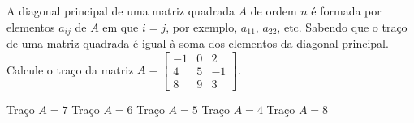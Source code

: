 A diagonal principal de uma matriz quadrada $A$ de ordem $n$ é formada por elementos $a_{ij}$ de $A$ em que $i=j$, por exemplo, $a_{11}$, $a_{22}$, etc. Sabendo que o traço de uma matriz quadrada é igual à soma dos elementos da diagonal principal. Calcule o traço da matriz $A = \left[ \begin{array}{ccc}
-1 & 0 & 2 \\
4 & 5 & -1 \\
8 & 9 & 3
\end{array} \right]$.

Traço $A=7$
Traço $A=6$
Traço $A=5$
Traço $A=4$
Traço $A=8$


